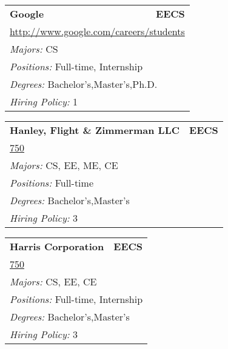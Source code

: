 \documentclass[twoside]{article}
\begin{document}
\begin{center}
\begin{multicols}{3}
\begin{FlushLeft}
\begin{minipage}{\columnwidth}
\end{minipage}
 
\begin{minipage}{\columnwidth}\begin{tabularx}{.95\columnwidth}{Xr}
                 {\Large\bf Google} & {\Large\bf EECS}\\
    \multicolumn{2}{p{.95\columnwidth}}{\url{http://www.google.com/careers/students}}\\
    \multicolumn{2}{p{.95\columnwidth}}{\emph{Majors:} CS}\\
    \multicolumn{2}{p{.95\columnwidth}}{\emph{Positions:} Full-time, Internship}\\
    \multicolumn{2}{p{.95\columnwidth}}{\emph{Degrees:} Bachelor's,Master's,Ph.D.}\\
    \multicolumn{2}{p{.95\columnwidth}}{\emph{Hiring Policy:} 1}\\
    \end{tabularx}
    
\end{minipage}
 
\begin{minipage}{\columnwidth}\begin{tabularx}{.95\columnwidth}{Xr}
                 {\Large\bf Hanley, Flight \& Zimmerman LLC} & {\Large\bf EECS}\\
    \multicolumn{2}{p{.95\columnwidth}}{\url{750}}\\
    \multicolumn{2}{p{.95\columnwidth}}{\emph{Majors:} CS, EE, ME, CE}\\
    \multicolumn{2}{p{.95\columnwidth}}{\emph{Positions:} Full-time}\\
    \multicolumn{2}{p{.95\columnwidth}}{\emph{Degrees:} Bachelor's,Master's}\\
    \multicolumn{2}{p{.95\columnwidth}}{\emph{Hiring Policy:} 3}\\
    \end{tabularx}
    
\end{minipage}
 
\begin{minipage}{\columnwidth}\begin{tabularx}{.95\columnwidth}{Xr}
                 {\Large\bf Harris Corporation} & {\Large\bf EECS}\\
    \multicolumn{2}{p{.95\columnwidth}}{\url{750}}\\
    \multicolumn{2}{p{.95\columnwidth}}{\emph{Majors:} CS, EE, CE}\\
    \multicolumn{2}{p{.95\columnwidth}}{\emph{Positions:} Full-time, Internship}\\
    \multicolumn{2}{p{.95\columnwidth}}{\emph{Degrees:} Bachelor's,Master's}\\
    \multicolumn{2}{p{.95\columnwidth}}{\emph{Hiring Policy:} 3}\\
    \end{tabularx}
    

\end{minipage}
\end{FlushLeft}
\end{multicols}
\end{center}
\end{document}
